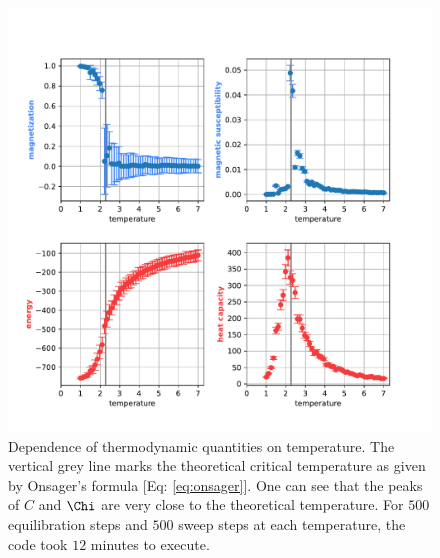 {\begin{figure}[H]
    \centering
    \includegraphics[width=\linewidth]{latex_source/images/ising/2d_scaling.pdf}
    \caption{Dependence of thermodynamic quantities on temperature. The vertical grey line marks the theoretical critical temperature as given by Onsager's formula [Eq: \ref{eq:onsager}]. One can see that the peaks of $C$ and $\Chi$ are very close to the theoretical temperature. For $500$ equilibration steps and $500$ sweep steps at each temperature, the code took $12$ minutes to execute.}
    \label{fig:2d_scaling}
\end{figure}
}